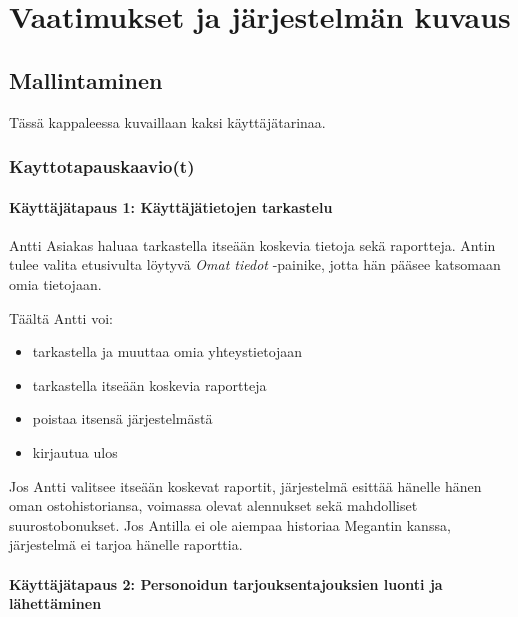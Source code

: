 \chapter{Vaatimukset ja järjestelmän kuvaus} %
\label{kuvaus} %
\thispagestyle{fancy} %


\section{Mallintaminen}  %
    Tässä kappaleessa kuvaillaan kaksi käyttäjätarinaa. 


\subsection{Kayttotapauskaavio(t)}    %

\subsubsection{Käyttäjätapaus 1: Käyttäjätietojen tarkastelu}   %

    Antti Asiakas haluaa tarkastella itseään koskevia tietoja sekä raportteja. Antin tulee valita etusivulta löytyvä
    \textit{Omat tiedot} -painike, jotta hän pääsee katsomaan omia tietojaan. 

    Täältä Antti voi:

    \begin{itemize}
        \item tarkastella ja muuttaa omia yhteystietojaan
        \item tarkastella itseään koskevia raportteja
        \item poistaa itsensä järjestelmästä
        \item kirjautua ulos
    \end{itemize}

    Jos Antti valitsee itseään koskevat raportit, järjestelmä esittää hänelle hänen oman ostohistoriansa,
    voimassa olevat alennukset sekä mahdolliset suurostobonukset.
    Jos Antilla ei ole aiempaa historiaa Megantin kanssa, järjestelmä ei tarjoa hänelle raporttia.

\subsubsection{Käyttäjätapaus 2: Personoidun tarjouksen\/tajouksien luonti ja lähettäminen}     %

